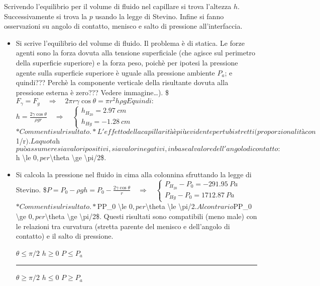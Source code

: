\documentclass[letterpaper,10pt,italian]{jupyterBook}
\begin{document}
\sphinxAtStartPar
Scrivendo l’equilibrio per il volume di fluido nel capillare si trova
l’altezza \(h\). Successivamente si trova la \(p\) usando la legge di
Stevino. Infine si fanno osservazioni su angolo di contatto, menisco e
salto di pressione all’interfaccia.
\begin{itemize}
\item {} 
\sphinxAtStartPar
Si scrive l’equilibrio del volume di fluido. Il problema è di
statica. Le forze agenti sono la forza dovuta alla tensione
superficiale (che agisce sul perimetro della superficie superiore) e
la forza peso, poichè per ipotesi la pressione agente sulla
superficie superiore è uguale alla pressione ambiente \(P_a\); e
quindi??? Perchè la componente verticale della risultante dovuta
alla pressione esterna è zero??? Vedere immagine…).
\$\(F_{\gamma} = F_g \quad \Rightarrow \quad 2\pi r \gamma  \cos \theta = \pi r^2 h \rho g\)\(
E quindi: \)\(h = \frac{2 \gamma \cos \theta}{\rho g r}
  \quad \Rightarrow \quad
  \begin{cases}
    h_{H_20} = 2.97 \ cm \\
    h_{Hg} = -1.28 \ cm
  \end{cases}\)\( *Commenti sul risultato.* L'effetto della
capillarità è più evidente per tubi stretti (proporzionalità con
\)1/r\(). La quota \)h\( può assumere sia valori positivi, sia valori
negativi, in base al valore dell'angolo di contatto: \)h \textbackslash{}le 0\(, per
\)\textbackslash{}theta \textbackslash{}ge \textbackslash{}pi/2\$.

\item {} 
\sphinxAtStartPar
Si calcola la pressione nel fluido in cima alla colonnina sfruttando
la legge di Stevino.
\$\(P = P_0 - \rho g h = P_0 - \frac{2 \gamma \cos \theta}{r}
  \quad \Rightarrow \quad
  \begin{cases}
    P_{H_20} - P_0 =  - 291.95 \ Pa \\
    P_{Hg}   - P_0 =  1712.87 \ Pa
  \end{cases}\)\( *Commenti sul risultato.* \)P\sphinxhyphen{}P\_0 \textbackslash{}le 0\(, per
\)\textbackslash{}theta \textbackslash{}le \textbackslash{}pi/2\(. Al contrario \)P\sphinxhyphen{}P\_0 \textbackslash{}ge 0\(, per
\)\textbackslash{}theta \textbackslash{}ge \textbackslash{}pi/2\$. Questi risultati sono compatibili (meno male)
con le relazioni tra curvatura (stretta parente del menisco e
dell’angolo di contatto) e il salto di pressione.

\sphinxAtStartPar
\(\theta \le \pi/2\)   \(h \ge 0\)   \(P \le P_a\)


\bigskip\hrule\bigskip


\sphinxAtStartPar
\(\theta \ge \pi/2\)   \(h \le 0\)   \(P \ge P_a\)

\end{itemize}
\end{document}
